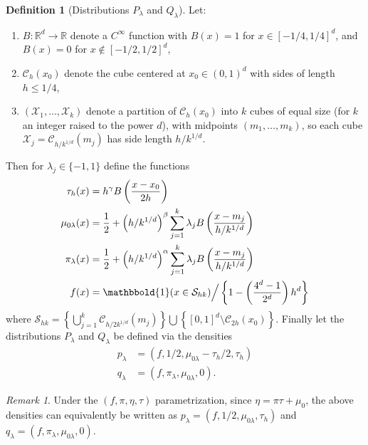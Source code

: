 \documentclass[11pt,twoside]{article}
\newcommand{\R}{\mathbb{R}}
\newcommand{\one}{\mathbbold{1}}
\theoremstyle{definition}
\newtheorem{definition}{Definition}
\theoremstyle{remark}
\newtheorem{remark}{Remark}
\begin{document}
\begin{definition}[Distributions $P_\lambda$ and $Q_\lambda$]  \label{def:construction}
Let:
\begin{enumerate}
\item $B: \R^d \rightarrow \R$ denote a $C^\infty$ function with $B(x)=1$ for $x \in [-1/4, 1/4]^d$, and $B(x)=0$ for $x \notin [-1/2,1/2]^d$,
\item $\mathcal{C}_h(x_0)$ denote the cube centered at $x_0 \in (0,1)^d$ with sides of length $h \leq 1/4$, 
\item $(\mathcal{X}_1,\dots,\mathcal{X}_k)$ denote a partition of $\mathcal{C}_h(x_0)$ into $k$ cubes of equal size (for $k$ an integer raised to the power $d$), with midpoints $(m_1,\dots,m_k)$, so each cube $\mathcal{X}_j = \mathcal{C}_{h/k^{1/d}}(m_j)$ has side length $h/k^{1/d}$.
\end{enumerate}
Then for $\lambda_j \in \{-1,1\}$ define the functions
\begin{align*}
\tau_h(x) &= h^\gamma B\left( \frac{x-x_0}{2h} \right)  \\
\mu_{0\lambda}(x) &= \frac{1}{2} +  \left( h/k^{1/d} \right)^{\beta} \sum_{j=1}^k \lambda_j B \left( \frac{x-m_j}{h/k^{1/d}}  \right) \\
\pi_\lambda(x) &=   \frac{1}{2} +   \left(  h/k^{1/d} \right)^{\alpha} \sum_{j=1}^k \lambda_j B \left( \frac{x-m_j}{h/k^{1/d}}  \right) \\
 f(x) &= \one(x \in \mathcal{S}_{hk}) \Big/ \left\{ 1  - \left( \frac{4^d - 1}{2^d} \right) h^d \right\}
\end{align*}
where $\mathcal{S}_{hk} = \left\{ \bigcup_{j=1}^k \mathcal{C}_{h/2k^{1/d}}(m_j) \right\} \bigcup \left\{ [0,1]^d \setminus \mathcal{C}_{2h}(x_0) \right\}$. 
Finally let the distributions $P_\lambda$ and $Q_\lambda$ be defined via the densities
\begin{align*}
p_\lambda &= (f,1/2, \mu_{0\lambda}-\tau_h/2,\tau_h) \\
q_\lambda &= (f,\pi_\lambda,\mu_{0\lambda},0) . 
\end{align*}
\end{definition}

\bigskip

\begin{remark}
Under the $(f,\pi,\eta,\tau)$ parametrization, since $\eta = \pi\tau+\mu_0$, the above densities can equivalently be written as $p_\lambda=(f,1/2, \mu_{0\lambda},\tau_h)$ and $q_\lambda=(f,\pi_\lambda,\mu_{0\lambda},0)$. \\
\end{remark}
\end{document}
